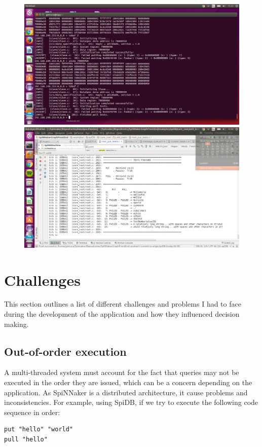 \begin{figure}
  \centering
  \includegraphics[width=1.15\linewidth, natwidth=1366, natheight=768]{images/debugging.png}
  \label{fig:debugging}
  \centering
  \includegraphics[width=1.15\linewidth, natwidth=1366, natheight=768]{images/testing.png}
  \label{fig:testing}
\end{figure}

\section{Challenges}
This section outlines a list of different challenges and problems I had to face during the development of the application and how they influenced decision making.

\subsection{Out-of-order execution}
\label{sec:out-of-order}
A multi-threaded system must account for the fact that queries may not be executed in the order they are issued, which can be a concern depending on the application. As SpiNNaker is a distributed architecture, it cause problems and inconsistencies.
For example, using SpiDB, if we try to execute the following code sequence in order:\\
\begin{lstlisting}[caption={Non-blocking execution}, label=list:non-blocking]
put "hello" "world"
pull "hello"
\end{lstlisting}

